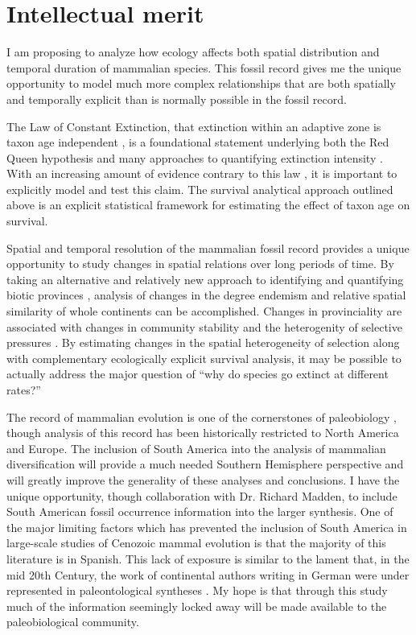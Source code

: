 \documentclass[11pt,letterpaper]{article}
\begin{document}
\section{Intellectual merit}
I am proposing to analyze how ecology affects both spatial distribution and temporal duration of mammalian species. This fossil record gives me the unique opportunity to model much more complex relationships that are both spatially and temporally explicit than is normally possible in the fossil record. 

The Law of Constant Extinction, that extinction within an adaptive zone is taxon age independent \citep{VanValen1973}, is a foundational statement underlying both the Red Queen hypothesis and many approaches to quantifying extinction intensity \citep{Alroy2014a,Foote1996e,Foote1997c,Foote2000,Raup1975,Sepkoski1975}. With an increasing amount of evidence contrary to this law \citep{Drake2014,Raup1975,Sepkoski1975,Finnegan2008}, it is important to explicitly model and test this claim. The survival analytical approach outlined above is an explicit statistical framework for estimating the effect of taxon age on survival.

Spatial and temporal resolution of the mammalian fossil record provides a unique opportunity to study changes in spatial relations over long periods of time. By taking an alternative and relatively new approach to identifying and quantifying biotic provinces \citep{Sidor2013,Vilhena2013b,Vilhena2013}, analysis of changes in the degree endemism and relative spatial similarity of whole continents can be accomplished. Changes in provinciality are associated with changes in community stability and the heterogenity of selective pressures \citep{Sidor2013,Vilhena2013}. By estimating changes in the spatial heterogeneity of selection along with complementary ecologically explicit survival analysis, it may be possible to actually address the major question of ``why do species go extinct at different rates?''

The record of mammalian evolution is one of the cornerstones of paleobiology \citep{Simpson1944}, though analysis of this record has been historically restricted to North America and Europe. The inclusion of South America into the analysis of mammalian diversification will provide a much needed Southern Hemisphere perspective and will greatly improve the generality of these analyses and conclusions. I have the unique opportunity, though collaboration with Dr. Richard Madden, to include South American fossil occurrence information into the larger synthesis. One of the major limiting factors which has prevented the inclusion of South America in large-scale studies of Cenozoic mammal evolution is that the majority of this literature is in Spanish. This lack of exposure is similar to the lament that, in the mid 20th Century, the work of continental authors writing in German were under represented in paleontological syntheses \citep{Gould1979a}. My hope is that through this study much of the information seemingly locked away will be made available to the paleobiological community.
\end{document}

